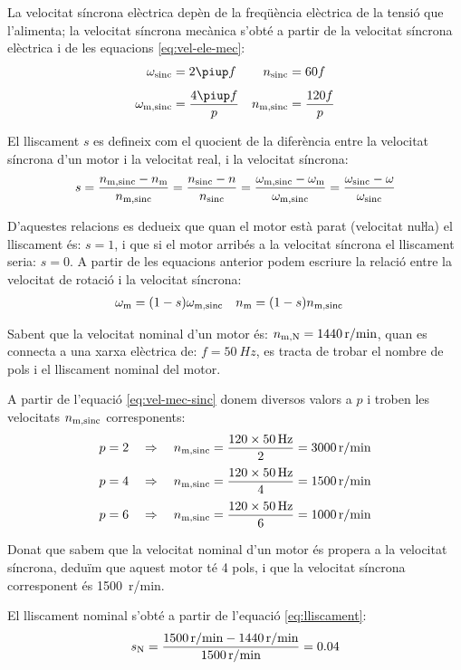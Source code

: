 La velocitat síncrona elèctrica depèn de la freqüència elèctrica de la tensió que l'alimenta; la velocitat síncrona mecànica s'obté a partir de la velocitat síncrona elèctrica i de  les equacions \eqref{eq:vel-ele-mec}:
\begin{subequations}
\begin{align}
    \omega\ped{sinc} &= 2 \piup f & n\ped{sinc} &= 60 f \\[1ex]
    \omega\ped{m,sinc} &= \frac{4 \piup f}{p} & n\ped{m,sinc} &= \frac{120 f}{p}\label{eq:vel-mec-sinc}
\end{align}
\end{subequations}

El lliscament $s$ es defineix com el quocient de la diferència entre la velocitat síncrona d'un motor i la velocitat real, i la velocitat síncrona:
\begin{equation}\label{eq:lliscament}\index{lliscament}
    s = \frac{n\ped{m,sinc}-n\ped{m}}{n\ped{m,sinc}} =
    \frac{n\ped{sinc}-n}{n\ped{sinc}} =
    \frac{\omega\ped{m,sinc}-\omega\ped{m}}{\omega\ped{m,sinc}} =
    \frac{\omega\ped{sinc}-\omega}{\omega\ped{sinc}}
\end{equation}

D'aquestes relacions es dedueix que quan el motor està parat (velocitat nuŀla) el lliscament és: $s=1$, i que si el motor arribés a la velocitat síncrona el lliscament seria: $s=0$. A partir de les equacions anterior podem escriure la relació entre la velocitat de rotació i la velocitat síncrona:
\begin{align}
    \omega_\mathrm{m} &= (1-s) \omega_\mathrm{m,sinc} & n_\mathrm{m} &= (1-s) n_\mathrm{m,sinc} \label{eq:wm-wsinc}
\end{align}

\begin{exemple}
    Sabent que la velocitat nominal d'un motor és: $n_\mathrm{m,N} = \SI{1440}{r/min}$, quan es connecta a una xarxa elèctrica de: $f = \SI{50}{Hz}$,  es tracta de trobar el nombre de pols i el lliscament nominal del motor.

    A partir de l'equació \eqref{eq:vel-mec-sinc} donem diversos valors a $p$ i troben les velocitats $n_\mathrm{m,sinc}$ corresponents:
    \begin{align*}
      p = 2 \quad  &\Rightarrow \quad n_\mathrm{m,sinc} = \frac{120 \times \SI{50}{Hz}}{2} = \SI{3000}{r/min}\\[0.5ex]
      p = 4 \quad  &\Rightarrow \quad n_\mathrm{m,sinc} = \frac{120 \times \SI{50}{Hz}}{4} = \SI{1500}{r/min}\\[0.5ex]
      p = 6 \quad  &\Rightarrow \quad n_\mathrm{m,sinc} = \frac{120 \times \SI{50}{Hz}}{6} = \SI{1000}{r/min}
    \end{align*}

    Donat que sabem que la velocitat nominal d'un motor és propera a la velocitat síncrona, deduïm que aquest motor té 4 pols, i que la velocitat síncrona corresponent és \SI{1500}{r/min}.

    El lliscament nominal s'obté a partir de l'equació \eqref{eq:lliscament}:
    \[
      s_\mathrm{N} = \frac{\SI{1500}{r/min} - \SI{1440}{r/min}}{\SI{1500}{r/min}} = \num{0,04}
    \]
\end{exemple}

